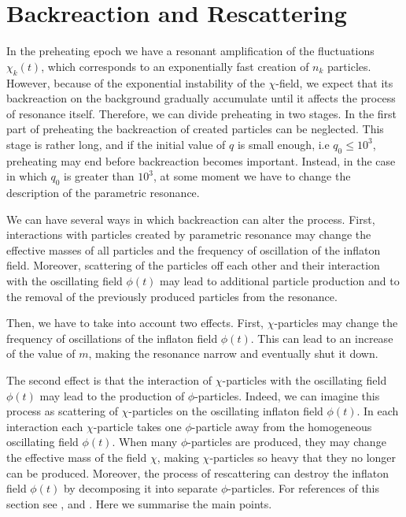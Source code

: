 \documentclass[11pt,a4paper,twoside]{book}
\begin{document}
\section{Backreaction and Rescattering}
In the preheating epoch we have a resonant amplification of the fluctuations $ \chi_{k}(t) $, which corresponds to an exponentially fast creation of $ n_{k} $ particles. However, because of the exponential  instability of the $\chi$-field, we expect that its backreaction on the background gradually accumulate until it affects the process of resonance itself. Therefore, we can divide preheating in two stages. In  the first part of preheating  the backreaction of created particles can be neglected. This stage is rather long, and if the initial value of $ q $ is small enough, i.e $ q_{0} \le 10^{3} $, preheating may end before backreaction becomes important. Instead, in the case in which $ q_{0} $ is greater than $ 10^{3}$, at some moment we have to change the description of the parametric resonance.

We can have several ways in which backreaction can alter the process. First, interactions with particles created by parametric resonance may change the effective masses of all particles and the frequency of oscillation of the inflaton field. Moreover, scattering of the particles off each other and their interaction with the oscillating field $ \phi(t) $ may lead to additional particle production and to the removal of the previously produced particles from the resonance.

Then, we have to take into account two effects. First, $\chi$-particles may change the frequency of oscillations of the inflaton field $ \phi(t) $. This can lead to an increase of the value of $ m $, making the resonance narrow and eventually shut it down.

The second effect is that the interaction of $ \chi $-particles with the oscillating field $ \phi(t) $ may lead to the production of $ \phi $-particles. Indeed, we can imagine this process as scattering of $ \chi $-particles on the oscillating inflaton field $ \phi(t) $. In each interaction each $\chi$-particle takes one $\phi$-particle away from the homogeneous oscillating field $ \phi(t) $. When many $\phi$-particles are produced, they may change the effective mass of the field $\chi$, making $ \chi $-particles so heavy that they no longer can be produced. Moreover, the process of rescattering can destroy the inflaton field $ \phi(t) $ by decomposing it into separate $ \phi $-particles. For references of this section see \cite{Chap4:LindePreheatingModel},\cite{Chap4:Reference1} and \cite{Chap4:Reference2}. Here we summarise the main points.
\end{document}
